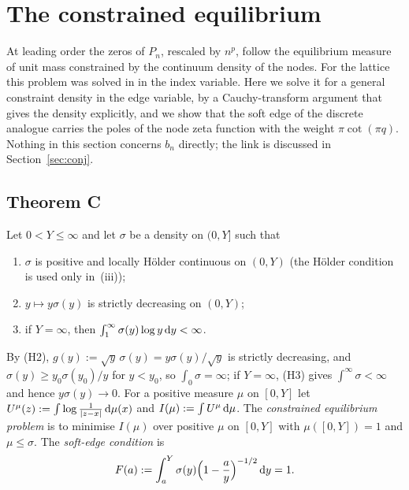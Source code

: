 \section{The constrained equilibrium}\label{sec:equilibrium}

At leading order the zeros of $P_n$, rescaled by $n^p$, follow the equilibrium measure of unit mass constrained by
the continuum density of the nodes. For the lattice this problem was solved in \cite[Theorem~1.3]{PaperI} in the index
variable. Here we solve it for a general constraint density in the edge variable, by a Cauchy-transform argument that
gives the density explicitly, and we show that the soft edge of the discrete analogue carries the poles of the node
zeta function with the weight $\pi\cot(\pi q)$. Nothing in this section concerns $b_n$ directly; the link is discussed
in Section~\ref{sec:conj}.

\subsection{Theorem C}\label{sec:thmQ}
Let $0<Y\le\infty$ and let $\sigma$ be a density on $(0,Y]$ such that
\begin{enumerate}
\item[(H1)] $\sigma$ is positive and locally H\"older continuous on $(0,Y)$ (the H\"older condition is used only in~(iii));
\item[(H2)] $y\mapsto y\sigma(y)$ is strictly decreasing on $(0,Y)$;
\item[(H3)] if $Y=\infty$, then $\int_1^\infty\sigma(y)\log y\,\mathrm{d} y<\infty$.
\end{enumerate}
By (H2), $g(y):=\sqrt y\,\sigma(y)=y\sigma(y)/\sqrt y$ is strictly decreasing, and $\sigma(y)\ge y_0\sigma(y_0)/y$ for
$y<y_0$, so $\int_0\sigma=\infty$; if $Y=\infty$, (H3) gives $\int^\infty\sigma<\infty$ and hence $y\sigma(y)\to0$.
For a positive measure $\mu$ on $[0,Y]$ let $U^\mu(z):=\int\log\frac1{|z-x|}\,\mathrm{d}\mu(x)$ and
$I(\mu):=\int U^\mu\,\mathrm{d}\mu$. The \emph{constrained equilibrium problem} is to minimise $I(\mu)$ over positive $\mu$ on
$[0,Y]$ with $\mu([0,Y])=1$ and $\mu\le\sigma$. The \emph{soft-edge condition} is
\begin{equation}\label{eq:Q}
  F(a):=\int_a^Y\sigma(y)\Bigl(1-\frac ay\Bigr)^{-1/2}\,\mathrm{d} y=1 .
\end{equation}


